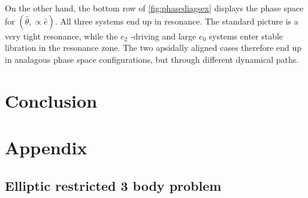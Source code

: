 \documentclass{mnras}
\begin{document}
On the other hand, the bottom row of \ref{fig:phasediagsex} displays the
phase space for \((\hat\theta,\propto \hat e)\).
All three systems end up in resonance. The standard picture is a very tight resonance, while the
\(e_2\) -driving and large \(e_0\) systems enter stable libration in the resonance zone.
The two apsidally aligned cases therefore end up in analagous phase space configurations, but
through different dynamical paths.

\section{Conclusion}
\label{sec:org4ac5572}

\clearpage

\section{Appendix}
\label{sec:orgaf1ec38}
\subsection{Elliptic restricted 3 body problem}
\label{sec:orgf2bbf4a}



\end{document}

